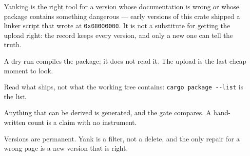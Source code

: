 Yanking is the right tool for a version whose documentation is wrong or whose package contains something dangerous ---
early versions of this crate shipped a linker script that wrote at \texttt{0x08000000}. It is not a substitute for
getting the upload right: the record keeps every version, and only a new one can tell the truth.

\begin{keytakeaways}
  \item A dry-run compiles the package; it does not read it. The upload is the last cheap moment to look.
  \item Read what ships, not what the working tree contains: \texttt{cargo package -{}-list} is the list.
  \item Anything that can be derived is generated, and the gate compares. A hand-written count is a claim with no
        instrument.
  \item Versions are permanent. Yank is a filter, not a delete, and the only repair for a wrong page is a new version
        that is right.
\end{keytakeaways}
